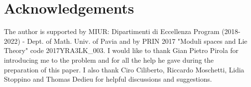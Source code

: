 \documentclass[12pt,a4paper,twoside,leqno,noamsfonts]{amsart}
\theoremstyle{definition}
\begin{document}
\section*{Acknowledgements}
The author is supported by MIUR: Dipartimenti di Eccellenza Program (2018-2022) - Dept. of Math. Univ. of Pavia and by PRIN 2017 "Moduli spaces and Lie Theory" code 2017YRA3LK\_003. 
I would like to thank Gian Pietro Pirola for introducing me to the problem and for all the help he gave during the preparation of this paper. I also thank Ciro Ciliberto, Riccardo Moschetti, Lidia Stoppino and Thomas Dedieu for helpful discussions and suggestions.




 
\end{document}
